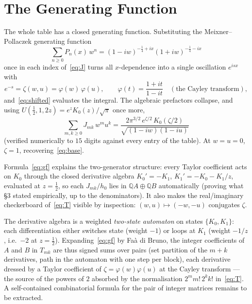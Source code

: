 \documentclass[11pt,a4paper]{article}
\newcommand{\Q}{\mathbb{Q}}
\begin{document}
\section{The Generating Function}

The whole table has a closed generating function. Substituting the
Meixner--Pollaczek generating function
\[
  \sum_{n \ge 0} P_n(x)\, w^n
  = (1-iw)^{-\frac14+ix} (1+iw)^{-\frac14-ix}
\]
once in each index of~\eqref{eq:J} turns all $x$-dependence into a
single oscillation $e^{isx}$ with
\[
  e^{-s} = \zeta(w,u) = \varphi(w)\,\varphi(u),
  \qquad
  \varphi(t) = \frac{1+it}{1-it}
  \quad (\text{the Cayley transform}),
\]
and~\eqref{eq:shifted} evaluates the integral. The algebraic
prefactors collapse, and using
$U(\tfrac12, 1, 2z) = e^{z} K_0(z)/\sqrt{\pi}$ once more,
\begin{equation}\label{eq:gf}
  \sum_{m,k \ge 0} J_{mk}\, w^m u^k
  = \frac{2\pi^{3/2}\, e^{\zeta/2}\, K_0(\zeta/2)}
         {\sqrt{(1-iw)(1-iu)}}
\end{equation}
(verified numerically to $15$ digits against every entry of the
table). At $w = u = 0$, $\zeta = 1$, recovering~\eqref{eq:base}.

Formula~\eqref{eq:gf} explains the two-generator structure: every
Taylor coefficient acts on $K_0$ through the closed derivative algebra
$K_0' = -K_1$, $K_1' = -K_0 - K_1/z$, evaluated at $z = \tfrac12$, so
each $J_{mk}/h_0$ lies in $\Q A \oplus \Q B$ automatically (proving
what \S3 stated empirically, up to the denominators). It also makes
the real/imaginary checkerboard of~\eqref{eq:T} visible by inspection:
$(w,u) \mapsto (-w,-u)$ conjugates $\zeta$.

The derivative algebra is a weighted \emph{two-state automaton} on
states $\{K_0, K_1\}$: each differentiation either switches state
(weight $-1$) or loops at $K_1$ (weight $-1/z$, i.e.\ $-2$ at
$z = \tfrac12$). Expanding~\eqref{eq:gf} by Fa\`a di Bruno, the
integer coefficients of $A$ and $B$ in $T_{mk}$ are thus signed sums
over pairs (set partition of the $m+k$ derivatives, path in the
automaton with one step per block), each derivative dressed by a
Taylor coefficient of $\zeta = \varphi(w)\varphi(u)$ at the Cayley
transform --- the source of the powers of $2$ absorbed by the
normalisation $2^m m!\, 2^k k!$ in~\eqref{eq:T}. A self-contained
combinatorial formula for the pair of integer matrices remains to be
extracted.
\end{document}
